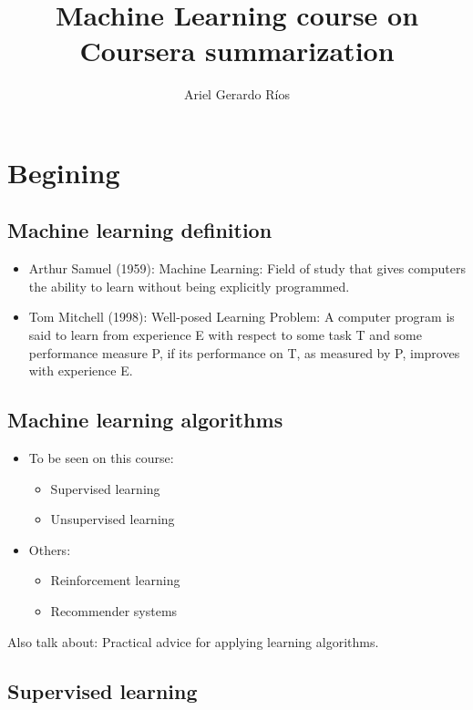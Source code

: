 \documentclass[a4paper]{report}
\begin{document}
  \title{Machine Learning course on Coursera summarization}
  \author{Ariel Gerardo Ríos}
  \date{}
  \maketitle

  \chapter{Begining}
    \section{Machine learning definition}
      \begin{itemize}
        \item Arthur Samuel (1959): Machine Learning: Field of study that gives
              computers the ability to learn without being explicitly
              programmed.
        \item Tom Mitchell (1998): Well-posed Learning Problem: A computer
              program is said to learn from experience E with respect to some
              task T and some performance measure P, if its performance on T,
              as measured by P, improves with experience E.
      \end{itemize}

    \section{Machine learning algorithms}
      \begin{itemize}
        \item To be seen on this course:
              \begin{itemize}
                \item Supervised learning
                \item Unsupervised learning
              \end{itemize}
        \item Others:
              \begin{itemize}
                \item Reinforcement learning
                \item Recommender systems
              \end{itemize}
      \end{itemize}
      Also talk about: Practical advice for applying learning algorithms.

  \section {Supervised learning}
\end{document}
